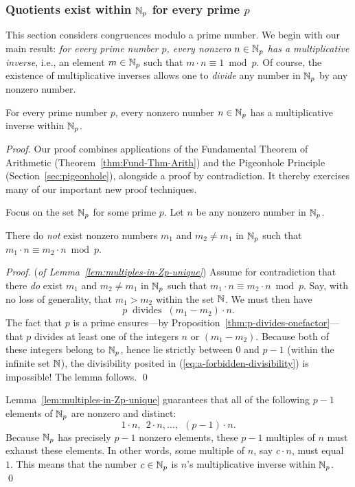 \subsubsection{Quotients exist within $\mathbb{N}_p$ for every prime $p$}
\label{sec:modular-quotientss}

This section considers congruences modulo a prime number.  We begin
with our main result: {\em for every prime number $p$, every nonzero
  $n \in \mathbb{N}_p$ has a {\em multiplicative inverse}}, i.e., an element
$m \in \mathbb{N}_p$ such that $m \cdot n \equiv 1 \bmod
p$.  Of course, the existence of
multiplicative inverses allows one to {\em divide} any number in
$\mathbb{N}_p$ by any nonzero number.

\begin{prop}
\label{thm:finite-field}
For every prime number $p$, every nonzero number $n \in \mathbb{N}_p$ has a
multiplicative inverse within $\mathbb{N}_p$.
\end{prop}

\begin{proof}
Our proof combines applications of the Fundamental Theorem of
Arithmetic (Theorem~\ref{thm:Fund-Thm-Arith}) and the Pigeonhole
Principle (Section~\ref{sec:pigeonhole}), alongside a proof by
contradiction.  It thereby exercises many of our important new proof
techniques.

Focus on the set $\mathbb{N}_p$ for some prime $p$.  Let $n$ be any nonzero
number in $\mathbb{N}_p$.  

\begin{lemma}
\label{lem:multiples-in-Zp-unique}
There do {\em not} exist nonzero numbers $m_1$ and $m_2 \neq m_1$ in
$\mathbb{N}_p$ such that $m_1 \cdot n \equiv m_2 \cdot n \bmod p$.
\end{lemma}

\begin{proof} ({\em of Lemma~\ref{lem:multiples-in-Zp-unique}})
Assume for contradiction that there {\em do} exist $m_1$ and $m_2 \neq
m_1$ in $\mathbb{N}_p$ such that $m_1 \cdot n \equiv m_2 \cdot n \bmod p$.
Say, with no loss of generality, that $m_1 > m_2$ within the set $\mathbb{N}$.
We must then have
\begin{equation}
\label{eq:a-forbidden-divisibility}
p \ \mbox{ divides } \ (m_1 - m_2) \cdot n.
\end{equation}
The fact that $p$ is a prime ensures---by
Proposition~\ref{thm:p-divides-onefactor}---that $p$ divides at least
one of the integers $n$ or $(m_1 - m_2)$.  Because both of these
integers belong to $\mathbb{N}_p$, hence lie strictly between $0$ and $p-1$
(within the infinite set $\mathbb{N}$), the divisibility posited in
(\ref{eq:a-forbidden-divisibility}) is impossible!  The lemma follows.
\qed
\end{proof}

Lemma~\ref{lem:multiples-in-Zp-unique} guarantees that all of the
following $p-1$ elements of $\mathbb{N}_p$ are nonzero and distinct:
\[ 1 \cdot n, \ \ 2 \cdot n, \ldots, \ \ (p-1) \cdot n. \]
Because $\mathbb{N}_p$ has precisely $p-1$ nonzero elements, these $p-1$
multiples of $n$ must exhaust these elements.  In other words, some
multiple of $n$, say $c \cdot n$, must equal $1$.  This means that the
number $c \in \mathbb{N}_p$ is $n$'s multiplicative inverse within $\mathbb{N}_p$.
\qed
\end{proof}

